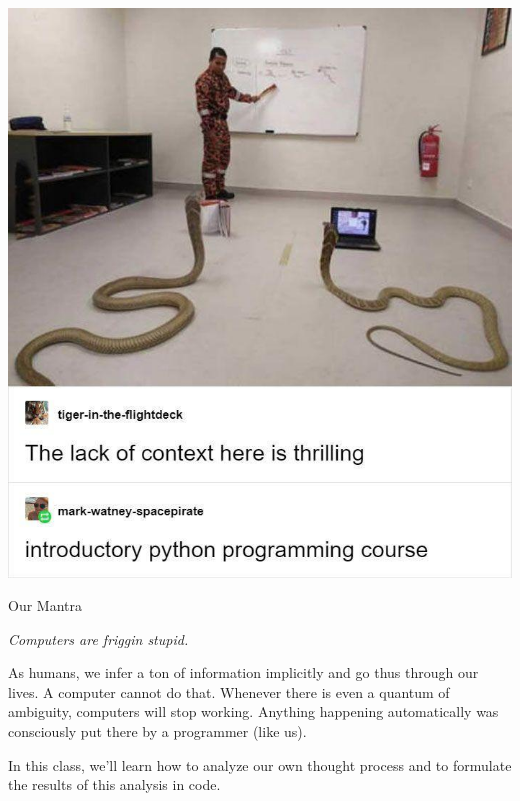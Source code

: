 
\begin{frame}[t,plain]
\titlepage
\end{frame}


\begin{frame}
%
\begin{center}
\includegraphics[width=.5\linewidth]{./gfx/intro}
\end{center}
%
\end{frame}


\begin{frame}{Our Mantra}
%
\begin{center}
\begin{Huge}
\emph{Computers are friggin stupid.}
\end{Huge}
\vspace{20pt}

As humans, we infer a ton of information implicitly and go thus through our lives. A computer cannot do that. Whenever there is even a quantum of ambiguity, computers will stop working. Anything happening automatically was consciously put there by a programmer (like us).
\vspace{10pt}

In this class, we'll learn how to analyze our own thought process and to formulate the results of this analysis in code.
\end{center}
%
\end{frame}


